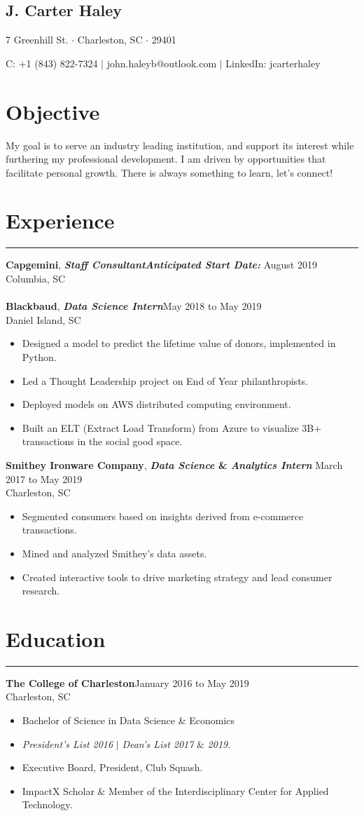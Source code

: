 \documentclass[11pt]{article}
\newcommand{\name}[1]{\begin{center}\section*{\huge #1}\end{center}}
\newcommand{\topinfo}[1]{\begin{center}\vspace{-0.2cm}#1\vspace{-0.2cm}\end{center}}
\newcommand{\resumesection}[1]{\vspace{-0.7cm}\section*{#1}\vspace{-0.2cm}\hrule\vspace{0.2cm}}
\newcommand{\objective}[1]{\section*{#1}\vspace{-0.3cm}}
\begin{document}
\name{J. Carter Haley}
\topinfo{7 Greenhill St. $\cdot$ Charleston, SC $\cdot$  29401}
\topinfo{C: +1 (843) 822-7324 $\vert$ john.haleyb@outlook.com $\vert$ LinkedIn: jcarterhaley}

\objective{Objective}
\setlength\parindent{0cm}
My goal is to serve an industry leading institution, and support its interest while furthering my professional development. I am driven by opportunities that facilitate personal growth. There is always something to learn, let's connect! \\

\resumesection{Experience}
\textbf{Capgemini},\textbf{\textit{ Staff Consultant}}\hfill \textbf{\textit{Anticipated Start Date:}} August 2019\\
 Columbia, SC
%
\\
\\
\textbf{Blackbaud},\textbf{\textit{ Data Science Intern}}\hfill May 2018 to May 2019\\
 Daniel Island, SC
\begin{itemize}
	\item Designed a model to predict the lifetime value of donors, implemented in Python.
	\item Led a Thought Leadership project on End of Year philanthropists.
	\item Deployed models on AWS distributed computing environment.
	\item Built an ELT (Extract Load Transform) from Azure to visualize 3B+ transactions in the social good space.\\
\end{itemize}
\textbf{Smithey Ironware Company},\textbf{\textit{ Data Science} \& \textit{Analytics Intern}} \hfill March 2017 to May 2019\\
Charleston, SC
\begin{itemize}
	\item Segmented consumers based on insights derived from e-commerce transactions.
	\item Mined and analyzed Smithey's data assets.
	\item Created interactive tools to drive marketing strategy and lead consumer research.\\
\end{itemize}

\resumesection{Education}
\textbf{The College of Charleston}\hfill January 2016 to May 2019\\
 Charleston, SC
\begin{itemize}
	\item Bachelor of Science in Data Science \& Economics
	\item \textit{President’s List 2016} $\vert$ \textit{Dean’s List 2017} \& \textit{2019}.
	\item  Executive Board, President, Club Squash.
	\item ImpactX Scholar \& Member of the Interdisciplinary Center for Applied Technology.\\
\end{itemize}
\end{document}
